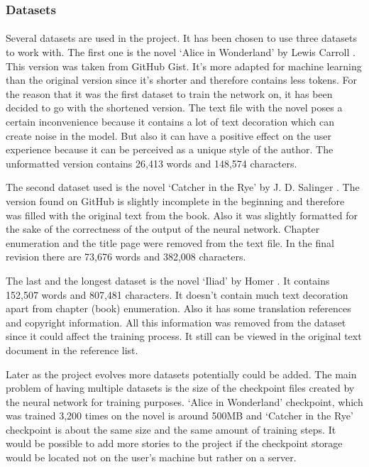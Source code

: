 \documentclass[12pt]{report}
\begin{document}


\subsubsection*{Datasets}
\paragraph{}
Several datasets are used in the project. It has been chosen to use three datasets to work with. The first one is
the novel `Alice in Wonderland' by Lewis Carroll \citep{alice_in_wonderland}. This version was taken from GitHub Gist.
It's more adapted for machine learning than the original version since it's shorter and therefore contains less tokens.
For the reason that it was the first dataset to train the network on, it has been decided to go with the shortened version.
The text file with the novel poses a certain inconvenience because it contains a lot of text decoration which can create
noise in the model. But also it can have a positive effect on the user experience because it can be perceived as a
unique style of the author. The unformatted version contains 26,413 words and 148,574 characters.

The second dataset used is the novel `Catcher in the Rye' by J. D. Salinger \citep{catcher_in_the_rye}. The version found on GitHub is
slightly incomplete in the beginning and therefore was filled with the original text from the book. Also it was slightly
formatted for the sake of the correctness of the output of the neural network. Chapter enumeration and the title page
were removed from the text file. In the final revision there are 73,676 words and 382,008 characters.

The last and the longest dataset is the novel `Iliad' by Homer \citep{the_iliad}. It contains 152,507 words and 807,481 characters.
It doesn't contain much text decoration apart from chapter (book) enumeration. Also it has some translation references and copyright information.
All this information was removed from the dataset since it could affect the training process. It still can be viewed in the original text document 
in the reference list.

Later as the project evolves more datasets potentially could be added. The main problem of having multiple datasets is the size of the
checkpoint files created by the neural network for training purposes. `Alice in Wonderland' checkpoint, which was trained 3,200 times on the novel
is around 500MB and `Catcher in the Rye' checkpoint is about the same size and the same amount of training steps. It would be possible to add more stories to the
project if the checkpoint storage would be located not on the user's machine but rather on a server.
\end{document}
